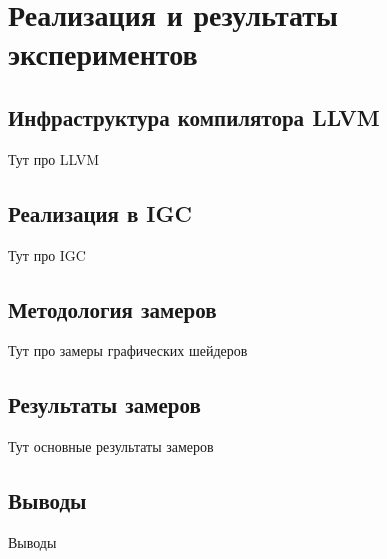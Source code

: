 \chapter{Реализация и результаты экспериментов}\label{ch:results}

\section{Инфраструктура компилятора LLVM}\label{sec:results/llvm}

Тут про LLVM

\section{Реализация в IGC}\label{sec:results/igc}

Тут про IGC

\section{Методология замеров}\label{sec:results/measures}

Тут про замеры графических шейдеров

\section{Результаты замеров}\label{sec:results/results}

Тут основные результаты замеров

\section{Выводы}\label{sec:results/outcome}

Выводы